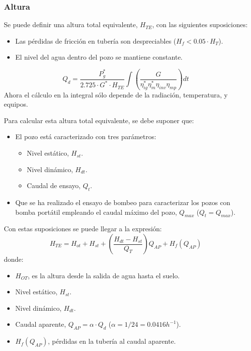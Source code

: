 \subsubsection{Altura}
\label{sec:orgd7be564}
Se puede definir una altura total equivalente, \(H_{TE}\), con las siguientes suposiciones:
\begin{itemize}
\item Las pérdidas de fricción en tubería son despreciables (\(H_f < 0.05 \cdot H_T\)).
\item El nivel del agua dentro del pozo se mantiene constante.
\end{itemize}
\begin{equation}
Q_d = \frac{P^*_g}{2.725 \cdot G^* \cdot H_{TE}} \int \left( \frac{G}{\eta_{ig}^{*} \eta_{m}^{*} \eta_{inv} \eta_{mp}} \right) dt
\end{equation}
Ahora el cálculo en la integral sólo depende de la radiación, temperatura, y equipos.

Para calcular esta altura total equivalente, se debe suponer que:
\begin{itemize}
\item El pozo está caracterizado con tres parámetros:
\begin{itemize}
\item Nivel estático, \(H_{st}\).
\item Nivel dinámico, \(H_{dt}\).
\item Caudal de ensayo, \(Q_t\). 
\end{itemize}
\item Que se ha realizado el ensayo de bombeo para caracterizar los pozos con bomba portátil empleando el caudal máximo del pozo, \(Q_{max}\) (\(Q_t=Q_{max}\)).
\end{itemize}

Con estas suposiciones se puede llegar a la expresión:
\begin{equation}
H_{TE} = H_{ot} + H_{st} + \left( \frac{H_{dt} - H_{st}}{Q_T} \right) Q_{AP} + H_f(Q_{AP})
\end{equation}
donde:
\begin{itemize}
\item \(H_{OT}\), es la altura desde la salida de agua hasta el suelo.
\item Nivel estático, \(H_{st}\).
\item Nivel dinámico, \(H_{dt}\).
\item Caudal aparente, \(Q_{AP} = \alpha \cdot Q_d\)
(\(\alpha=1/24=0.0416h^{-1}\)).
\item \(H_f(Q_{AP})\), pérdidas en la tubería al caudal aparente.
\end{itemize}

